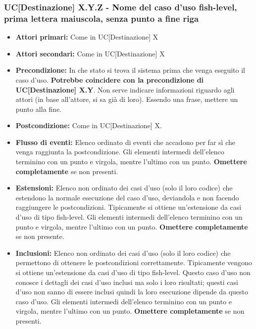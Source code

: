 \documentclass[a4paper, oneside]{article} %
\begin{document}
\subsubsection{UC[Destinazione] X.Y.Z - Nome del caso d'uso fish-level, prima lettera maiuscola, senza punto a fine riga}%
\begin{itemize}
	\item \textbf{Attori primari:} Come in UC[Destinazione] X
	\item \textbf{Attori secondari:} Come in UC[Destinazione] X
	\item \textbf{Precondizione:} In che stato si trova il sistema prima che venga eseguito il caso d'uso. \textbf{Potrebbe coincidere con la precondizione di UC[Destinazione] X.Y}. Non serve indicare informazioni riguardo agli attori (in base all'attore, si sa già di loro). Essendo una frase, mettere un punto alla fine.
	\item \textbf{Postcondizione:} Come in UC[Destinazione] X.
	\item \textbf{Flusso di eventi:} Elenco ordinato di eventi che accadono per far sì che venga raggiunta la postcondizione. Gli elementi intermedi dell'elenco terminino con un punto e virgola, mentre l'ultimo con un punto. \textbf{Omettere completamente} se non presenti.
	\item \textbf{Estensioni:} Elenco non ordinato dei casi d'uso (solo il loro codice) che estendono la normale esecuzione del caso d'uso, deviandola e non facendo raggiungere le postcondizioni. Tipicamente si ottiene un'estensione da casi d'uso di tipo fish-level. Gli elementi intermedi dell'elenco terminino con un punto e virgola, mentre l'ultimo con un punto. \textbf{Omettere completamente} se non presente.
	\item \textbf{Inclusioni:} Elenco non ordinato dei casi d'uso (solo il loro codice) che permettono di ottenere le postcondizioni correttamente. Tipicamente vengono si ottiene un'estensione da casi d'uso di tipo fish-level. Questo caso d'uso non conosce i dettagli dei casi d'uso inclusi ma solo i loro risultati; questi casi d'uso non sanno di essere inclusi quindi la loro esecuzione dipende da questo caso d'uso. Gli elementi intermedi dell'elenco terminino con un punto e virgola, mentre l'ultimo con un punto.  \textbf{Omettere completamente} se non presenti.
\end{itemize}
\end{document}
